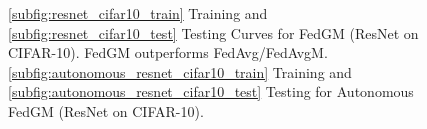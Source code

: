 \begin{figure}[h]

\centering
{}
\hspace{-2pt}
\hspace{-2pt}
\hspace{-2pt}

\caption{\ref{subfig:resnet_cifar10_train} Training and \ref{subfig:resnet_cifar10_test} Testing Curves for FedGM (ResNet on CIFAR-10). FedGM outperforms FedAvg/FedAvgM. \ref{subfig:autonomous_resnet_cifar10_train} Training and \ref{subfig:autonomous_resnet_cifar10_test} Testing for Autonomous FedGM (ResNet on CIFAR-10).}
\label{fig:resnet_cifar10}

\end{figure}

